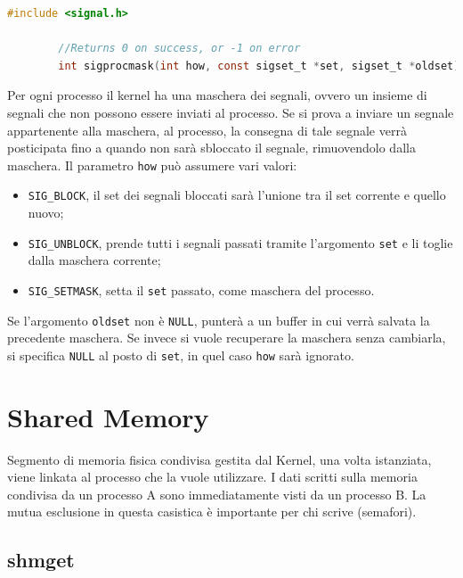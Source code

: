 \documentclass[a4paper, 12pt]{book}
\begin{document}
    \begin{lstlisting}[language=C]
        #include <signal.h>

        //Returns 0 on success, or -1 on error  
        int sigprocmask(int how, const sigset_t *set, sigset_t *oldset);
    \end{lstlisting}
    Per ogni processo il kernel ha una maschera dei segnali, 
    ovvero un insieme di segnali che non possono essere 
    inviati al processo. Se si prova a inviare un segnale 
    appartenente alla maschera, al processo, la consegna 
    di tale segnale verrà posticipata fino a quando 
    non sarà sbloccato il segnale, rimuovendolo dalla maschera.
    Il parametro \verb|how| può assumere vari valori:
    \begin{itemize}
        \item \verb|SIG_BLOCK|, il set dei segnali bloccati 
        sarà l'unione tra il set corrente e quello nuovo;
        \item \verb|SIG_UNBLOCK|, prende tutti i segnali passati tramite
        l'argomento \verb|set| e li toglie dalla maschera corrente;
        \item \verb|SIG_SETMASK|, setta il \verb|set| passato, 
        come maschera del processo.
    \end{itemize}
    Se l'argomento \verb|oldset| non è \verb|NULL|, punterà 
    a un buffer in cui verrà salvata la precedente maschera.
    Se invece si vuole recuperare la maschera senza cambiarla, 
    si specifica \verb|NULL| al posto di \verb|set|, in quel 
    caso \verb|how| sarà ignorato.

    \section{Shared Memory}

    Segmento di memoria fisica condivisa gestita dal 
    Kernel, una volta istanziata, viene linkata al 
    processo che la vuole utilizzare. I dati scritti 
    sulla memoria condivisa da un processo A sono 
    immediatamente visti da un processo B. La mutua esclusione 
    in questa casistica è importante per chi scrive (semafori).
    
    \subsection{shmget}
\end{document}
